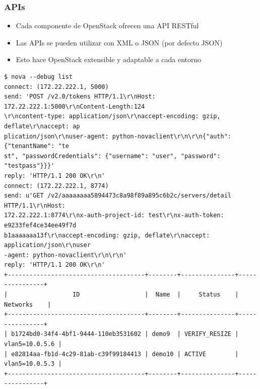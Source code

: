 \documentclass{beamer}
\begin{document}
\begin{frame}[fragile]
  \frametitle{APIs}
  \begin{itemize}
  \item Cada componente de OpenStack ofrecen una API RESTful
  \item Las APIs se pueden utilizar con XML o JSON (por defecto JSON)
  \item Esto hace OpenStack extensible y adaptable a cada entorno
  \end{itemize}
  \begin{center}
  \begin{lstlisting}
$ nova --debug list
connect: (172.22.222.1, 5000)
send: 'POST /v2.0/tokens HTTP/1.1\r\nHost: 172.22.222.1:5000\r\nContent-Length:124
\r\ncontent-type: application/json\r\naccept-encoding: gzip, deflate\r\naccept: ap
plication/json\r\nuser-agent: python-novaclient\r\n\r\n{"auth": {"tenantName": "te
st", "passwordCredentials": {"username": "user", "password": "testpass"}}}'
reply: 'HTTP/1.1 200 OK\r\n'
connect: (172.22.222.1, 8774)
send: u'GET /v2/aaaaaaaa5894473c8a98f89a895c6b2c/servers/detail HTTP/1.1\r\nHost: 
172.22.222.1:8774\r\nx-auth-project-id: test\r\nx-auth-token: e9233fef4ce34ee49f7d
b1aaaaaaa13f\r\naccept-encoding: gzip, deflate\r\naccept: application/json\r\nuser
-agent: python-novaclient\r\n\r\n'
reply: 'HTTP/1.1 200 OK\r\n'
+--------------------------------------+--------+---------------+----------------+
|                  ID                  |  Name  |     Status    |    Networks    |
+--------------------------------------+--------+---------------+----------------+
| b1724bd0-34f4-4bf1-9444-110eb3531602 | demo9  | VERIFY_RESIZE | vlan5=10.0.5.6 |
| e82814aa-fb1d-4c29-81ab-c39f99184413 | demo10 | ACTIVE        | vlan5=10.0.5.3 |
+--------------------------------------+--------+---------------+----------------+
  \end{lstlisting}
\end{center}
\end{frame}
\end{document}
